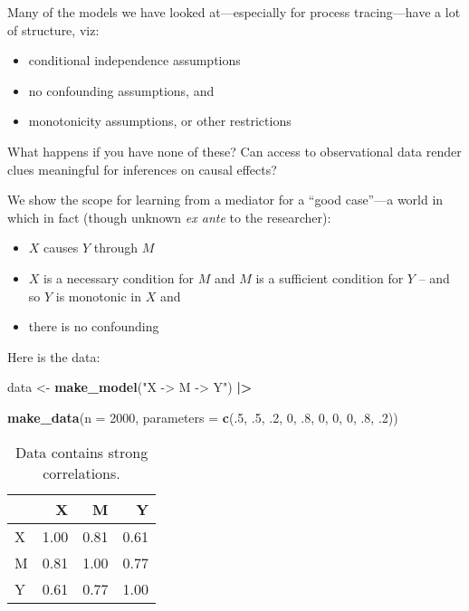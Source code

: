 \documentclass[
  12pt,
]{book}
\newenvironment{Shaded}{\begin{snugshade}}{\end{snugshade}}
\newcommand{\AttributeTok}[1]{\textcolor[rgb]{0.13,0.29,0.53}{#1}}
\newcommand{\DecValTok}[1]{\textcolor[rgb]{0.00,0.00,0.81}{#1}}
\newcommand{\FunctionTok}[1]{\textcolor[rgb]{0.13,0.29,0.53}{\textbf{#1}}}
\newcommand{\NormalTok}[1]{#1}
\newcommand{\OtherTok}[1]{\textcolor[rgb]{0.56,0.35,0.01}{#1}}
\newcommand{\SpecialCharTok}[1]{\textcolor[rgb]{0.81,0.36,0.00}{\textbf{#1}}}
\newcommand{\StringTok}[1]{\textcolor[rgb]{0.31,0.60,0.02}{#1}}
\providecommand{\tightlist}{%
  \setlength{\itemsep}{0pt}\setlength{\parskip}{0pt}}
\begin{document}
Many of the models we have looked at---especially for process tracing---have a lot of structure, viz:

\begin{itemize}
\tightlist
\item
  conditional independence assumptions
\item
  no confounding assumptions, and
\item
  monotonicity assumptions, or other restrictions
\end{itemize}

What happens if you have none of these? Can access to observational data render clues meaningful for inferences on causal effects?

We show the scope for learning from a mediator for a ``good case''---a world in which in fact (though unknown \emph{ex ante} to the researcher):

\begin{itemize}
\tightlist
\item
  \(X\) causes \(Y\) through \(M\)
\item
  \(X\) is a necessary condition for \(M\) and \(M\) is a sufficient condition for \(Y\) -- and so \(Y\) is monotonic in \(X\) and
\item
  there is no confounding
\end{itemize}

Here is the data:

\begin{Shaded}
\begin{Highlighting}[]
\NormalTok{data }\OtherTok{\textless{}{-}} \FunctionTok{make\_model}\NormalTok{(}\StringTok{"X {-}\textgreater{} M {-}\textgreater{} Y"}\NormalTok{) }\SpecialCharTok{|\textgreater{}} 
  
        \FunctionTok{make\_data}\NormalTok{(}\AttributeTok{n =} \DecValTok{2000}\NormalTok{, }
                  \AttributeTok{parameters =} \FunctionTok{c}\NormalTok{(.}\DecValTok{5}\NormalTok{, .}\DecValTok{5}\NormalTok{, .}\DecValTok{2}\NormalTok{, }\DecValTok{0}\NormalTok{, .}\DecValTok{8}\NormalTok{, }\DecValTok{0}\NormalTok{, }\DecValTok{0}\NormalTok{, }\DecValTok{0}\NormalTok{, .}\DecValTok{8}\NormalTok{, .}\DecValTok{2}\NormalTok{))}
\end{Highlighting}
\end{Shaded}

\begin{table}

\caption{\label{tab:unnamed-chunk-107}Data contains strong correlations.}
\centering
\begin{tabular}[t]{l|r|r|r}
\hline
  & X & M & Y\\
\hline
X & 1.00 & 0.81 & 0.61\\
\hline
M & 0.81 & 1.00 & 0.77\\
\hline
Y & 0.61 & 0.77 & 1.00\\
\hline
\end{tabular}
\end{table}
\end{document}

